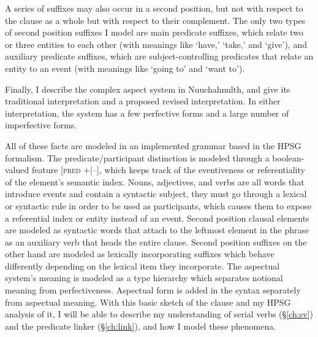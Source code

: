 A series of suffixes may also occur in a second position, but not with respect to the clause as a whole but with respect to their complement. The only two types of second position suffixes I model are main predicate suffixes, which relate two or three entities to each other (with meanings like `have,' `take,' and `give'), and auxiliary predicate suffixes, which are subject-controlling predicates that relate an entity to an event (with meanings like `going to' and `want to').

Finally, I describe the complex aspect system in Nuuchahnulth, and give its traditional interpretation and a proposed revised interpretation. In either interpretation, the system has a few perfective forms and a large number of imperfective forms.

All of these facts are modeled in an implemented grammar based in the HPSG formalism. The predicate/participant distinction is modeled through a boolean-valued feature [\textsc{pred} +|--], which keeps track of the eventiveness or referentiality of the element's semantic index. Nouns, adjectives, and verbs are all words that introduce events and contain a syntactic subject, they must go through a lexical or syntactic rule in order to be used as participants, which causes them to expose a referential index or entity instead of an event. Second position clausal elements are modeled as syntactic words that attach to the leftmost element in the phrase as an auxiliary verb that heads the entire clause. Second position suffixes on the other hand are modeled as lexically incorporating suffixes which behave differently depending on the lexical item they incorporate. The aspectual system's meaning is modeled as a type hierarchy which separates notional meaning from perfectiveness. Aspectual form is added in the syntax separately from aspectual meaning. With this basic sketch of the clause and my HPSG analysis of it, I will be able to describe my understanding of serial verbs (\S\ref{ch:sv}) and the predicate linker (\S\ref{ch:link}), and how I model these phenomena.
